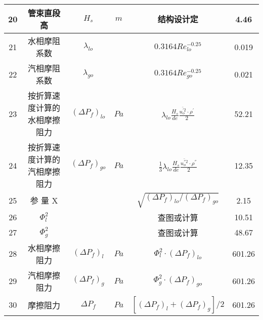 \begin{table}[H]
{\begin{tabular}{|c|c|c|c|c|c|}
            20   & 管束直段高                   & $ H_s $                   & $ m $      & 结构设计定                                                                                    & 4.46             \\ \hline
            21   & 水相摩阻系数                 & $ \lambda_{lo} $          &            & $ 0.3164Re_{lo}^{-0.25} $                                                                     & 0.019            \\ \hline
            22   & 汽相摩阻系数                 & $ \lambda_{go} $          &            & $ 0.3164Re_{go}^{-0.25} $                                                                     & 0.021            \\ \hline
            23   & 按折算速度计算的水相摩擦阻力 & $ (\Delta P_f)_{lo} $     & $ Pa $     & $ \lambda_{lo} \frac{H_s}{de} \frac{\overline{u_{o}^{'2}} \cdot  \rho^{'}}{2} $               & 52.21            \\ \hline
            24   & 按折算速度计算的汽相摩擦阻力 & $ (\Delta P_f)_{go} $     & $ Pa $     & $ \frac{1}{3} \lambda_{lo} \frac{H_s}{de} \frac{\overline{u_{o}^{''2}} \cdot  \rho^{''}}{2} $ & 12.35            \\ \hline
            25   & 参 量 X                      &                           &            & $ \sqrt{(\Delta P_f)_{lo}/(\Delta P_f)_{go}} $                                                & 2.15             \\ \hline
            26   & $ \Phi_{l}^{2} $             &                           &            & 查图或计算                                                                                    & 10.51            \\ \hline
            27   & $ \Phi_{g}^{2} $             &                           &            & 查图或计算                                                                                    & 48.67            \\ \hline
            28   & 水相摩擦阻力                 & $ (\Delta P_f)_{l} $      & $ Pa $     & $ \Phi_{l}^{2} \cdot (\Delta P_f)_{lo} $                                                      & 601.26           \\ \hline
            29   & 汽相摩擦阻力                 & $ (\Delta P_f)_{g} $      & $ Pa $     & $ \Phi_{g}^{2} \cdot (\Delta P_f)_{go} $                                                      & 601.26           \\ \hline
            30   & 摩擦阻力                     & $ \Delta P_f $            & $ Pa $     & $ [(\Delta P_f)_{l}+(\Delta P_f)_{g}]/2 $                                                     & 601.26           \\ \hline
        \end{tabular}
    }
\end{table}

